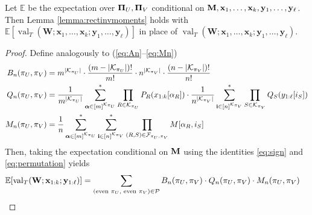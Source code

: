\documentclass[10pt,reqno]{amsart}
\def\x{\mathbf{x}}
\def\y{\mathbf{y}}
\def\W{\mathbf{W}}
\def\E{\mathbb{E}}
\def\val{\operatorname{val}}
\def\bi{\mathbf{i}}
\begin{document}
\begin{lemma}\label{lemma:Erectinvmoments}
Let $\E$ be the expectation over $\bm{\Pi}_U,\bm{\Pi}_V$ conditional on
$\bM,\x_1,\ldots,\x_k,\y_1,\ldots,\y_\ell$. Then
Lemma \ref{lemma:rectinvmoments} holds with
$\E[\val_T(\W;\x_1,\ldots,\x_k;\y_1,\ldots,\y_\ell)]$ in place of
$\val_T(\W;\x_1,\ldots,\x_k;\y_1,\ldots,\y_\ell)$.
\end{lemma}
\begin{proof}
Define analogously to (\ref{eq:An}--\ref{eq:Mn})
\begin{align}
B_n(\pi_U,\pi_V)&=m^{|\cK_{\pi_U}|} \cdot \frac{(m-|\cK_{\pi_U}|)!}{m!} \cdot
n^{|\cK_{\pi_V}|} \cdot \frac{(n-|\cK_{\pi_V}|)!}{n!}\label{eq:Anrect}\\
Q_n(\pi_U,\pi_V)&=\frac{1}{m^{|\cK_{\pi_U}|}} \sum_{\balpha\in[m]^{\cK_{\pi_U}}}^*
\prod_{R \in \cK_{\pi_U}} P_R(x_{1:k}[\alpha_R]) \cdot
\frac{1}{n^{|\cK_{\pi_V}|}} \sum_{\bi \in [n]^{\cK_{\pi_V}}}^*
\prod_{S \in \cK_{\pi_V}} Q_S(y_{1:\ell}[i_S])\label{eq:Qnrect}\\
M_n(\pi_U,\pi_V)&=\frac{1}{n} \sum_{\balpha\in[m]^{\cK_{\pi_U}}}^*
	\sum_{\bi\in[n]^{\cK_{\pi_V}}}^*
	\prod_{(R,S)\in\cF_{\pi_U,\pi_V}} M[\alpha_R,i_S]\label{eq:Mnrect}
\end{align}
Then, taking the expectation conditional on $\mathbf{M}$ using
the identities \eqref{eq:sign} and \eqref{eq:permutation} yields
\begin{align*}
	\E[\val_T(\W;\x_{1:k};\y_{1:\ell})]
	&=\sum_{(\text{even } \pi_U,\text{ even } \pi_V) \in \cP}
	B_n(\pi_U,\pi_V) \cdot Q_n(\pi_U,\pi_V) \cdot M_n(\pi_U,\pi_V)
\end{align*}


\end{proof}
\end{document}
